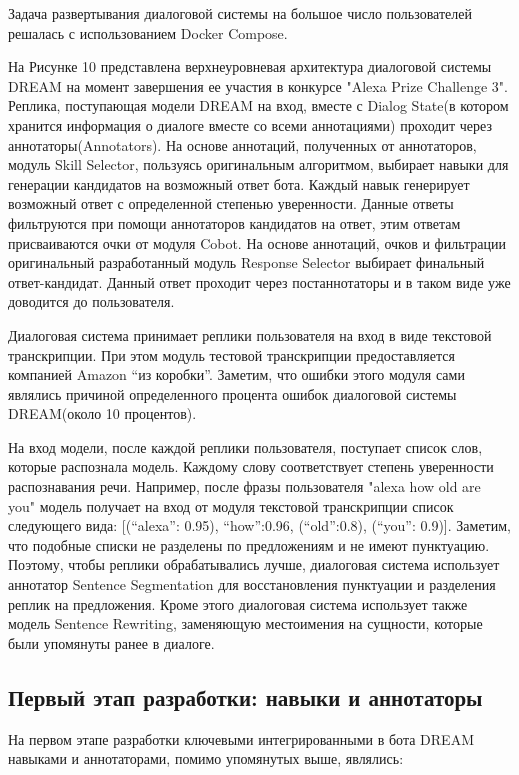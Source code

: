 Задача развертывания диалоговой системы на большое число пользователей решалась с использованием Docker Compose. \cite{na_website_ndk}

На Рисунке 10 представлена верхнеуровневая архитектура диалоговой системы DREAM на момент завершения ее участия в конкурсе "Alexa Prize Challenge 3". Реплика, поступающая модели DREAM на вход, вместе с Dialog State(в котором хранится информация о диалоге вместе со всеми аннотациями) проходит через аннотаторы(Annotators). На основе аннотаций, полученных от аннотаторов, модуль Skill Selector, пользуясь оригинальным алгоритмом, выбирает навыки для генерации кандидатов на возможный ответ бота. Каждый навык генерирует возможный ответ с определенной степенью уверенности. Данные ответы фильтруются при помощи аннотаторов кандидатов на ответ, этим ответам присваиваются очки от модуля Cobot. На основе аннотаций, очков и фильтрации оригинальный разработанный модуль Response Selector выбирает финальный ответ-кандидат. Данный ответ проходит через постаннотаторы и в таком виде уже доводится до пользователя.

Диалоговая система принимает реплики пользователя на вход в виде текстовой транскрипции. При этом модуль тестовой транскрипции предоставляется компанией Amazon “из коробки”. Заметим, что ошибки этого модуля сами являлись причиной определенного процента ошибок диалоговой системы DREAM(около 10 процентов).

На вход модели, после каждой реплики пользователя, поступает список слов, которые распознала модель. Каждому слову соответствует степень уверенности распознавания речи. Например, после фразы пользователя "alexa how old are you" модель получает на вход от модуля текстовой транскрипции список следующего вида: [(“alexa”: 0.95), “how”:0.96, (“old”:0.8), (“you”: 0.9)]. Заметим, что подобные списки не разделены по предложениям и не имеют пунктуацию. Поэтому, чтобы реплики обрабатывались лучше, диалоговая система использует аннотатор Sentence Segmentation для восстановления пунктуации и разделения реплик на предложения. Кроме этого диалоговая система использует также модель Sentence Rewriting, заменяющую местоимения на сущности, которые были упомянуты ранее в диалоге.


\subsection{Первый этап разработки: навыки и аннотаторы}

На первом этапе разработки ключевыми интегрированными в бота DREAM навыками и аннотаторами, помимо упомянутых выше, являлись:

